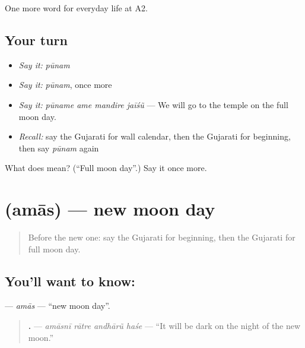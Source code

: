 \begin{grammarlens}[title={What you've built}]
One more word for everyday life at A2.
\end{grammarlens}

\subsection*{Your turn}
\begin{itemize}
\raggedright
  \item \emph{Say it:} \emph{pūnam}
  \item \emph{Say it:} \emph{pūnam}, once more
  \item \emph{Say it:} \emph{pūname ame mandire jaīśũ} — We will go to the temple on the full moon day.
  \item \emph{Recall:} say the Gujarati for wall calendar, then the Gujarati for beginning, then say \emph{pūnam} again
\end{itemize}

\begin{tcolorbox}[breakable,colback=teal!4,colframe=teal!35!black,title={Before you move on}]
What does  mean? (\textquotedblleft{}Full moon day\textquotedblright{}.) Say it once more.
\end{tcolorbox}
\section[\texorpdfstring{\gu{અમાસ} (amās)}{અમાસ (amās)}]{ (amās) — new moon day}

\label{lesson:GU-C175-amas}



\begin{quote}
Before the new one: say the Gujarati for beginning, then the Gujarati for full moon day.
\end{quote}

\subsection*{You'll want to know: }
\textbf{} — \emph{amās} — \textquotedblleft{}new moon day\textquotedblright{}.

\begin{quote}
\textbf{   .} — \emph{amāsnī rātre andhārũ haśe} — \textquotedblleft{}It will be dark on the night of the new moon.\textquotedblright{}
\end{quote}

